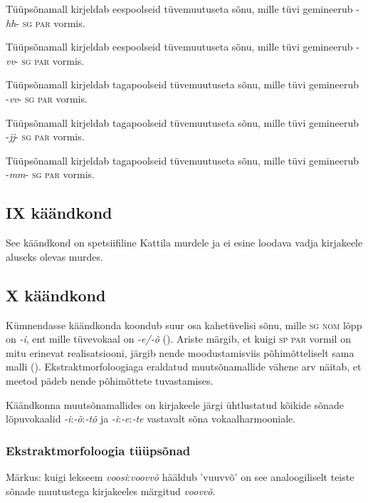 \documentclass[12pt,a4paper]{article}
\newcommand{\vadja}[1]{\textit{#1}}
\newcommand{\msd}[1]{\textsc{#1}}
\begin{document}

Tüüpsõna\-mall kirjeldab eespoolseid tüvemuutuseta sõnu, mille tüvi gemineerub -\textit{hh}- \msd{sg par} vormis.

Tüüpsõna\-mall kirjeldab eespoolseid tüvemuutuseta sõnu, mille tüvi gemineerub -\textit{vv}- \msd{sg par} vormis.

Tüüpsõna\-mall kirjeldab tagapoolseid tüvemuutuseta sõnu, mille tüvi gemineerub -\textit{vv}- \msd{sg par} vormis.

Tüüpsõna\-mall kirjeldab tagapoolseid tüvemuutuseta sõnu, mille tüvi gemineerub -\textit{jj}- \msd{sg par} vormis.

Tüüpsõna\-mall kirjeldab tagapoolseid tüvemuutuseta sõnu, mille tüvi gemineerub -\textit{mm}- \msd{sg par} vormis.



\subsection{\RN{9} käändkond}
See käändkond on spetsiifiline Kattila murdele ja ei esine loodava vadja kirjakeele aluseks olevas murdes.


\subsection{\RN{10} käändkond}

Kümnendasse käändkonda koondub suur osa kahetüvelisi sõnu, mille \msd{sg nom} lõpp on \vadja{-i}, ent mille tüvevokaal on \vadja{-e/-õ} (\cite[47]{ariste_grammar_1968}). Ariste märgib, et kuigi \msd{sp par} vormil on mitu erinevat realisatsiooni, järgib nende moodustamis\-viis põhimõtteliselt sama malli (\cite[47]{ariste_grammar_1968}). Ekstrakt\-morfoloogiaga eraldatud muutsõnamallide vähene arv näitab, et meetod pädeb nende põhimõttete tuvastamises.

Käändkonna muutsõnamallides on kirjakeele järgi ühtlustatud kõikide sõnade lõpuvokaalid \textit{-i}:\textit{-õ}:\textit{-tõ} ja \textit{-i}:\textit{-e}:\textit{-te} vastavalt sõna vokaalharmooniale.

\subsubsection*{Ekstraktmorfoloogia tüüpsõnad}
\vspace{-3.5em}






Märkus: kuigi lekseem \textit{voosi}:\textit{voovvõ} hääldub 'vuuvvõ' on see analoogiliselt teiste sõnade muutustega kirjakeeles märgitud \textit{voovvõ}.






\end{document}

